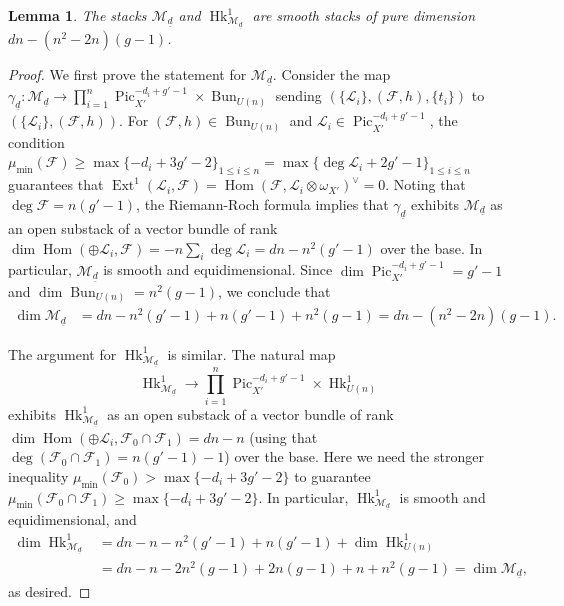 \documentclass[reqno]{amsart}
\numberwithin{equation}{section}
\newcommand{\inj}{\hookrightarrow}
\DeclareMathOperator{\Hom}{Hom}
\DeclareMathOperator{\Aut}{Aut}
\DeclareMathOperator{\Bun}{Bun}
\DeclareMathOperator{\Ext}{Ext}
\DeclareMathOperator{\Pic}{Pic}
\DeclareMathOperator{\Hk}{Hk}
\newcommand\un{\underline}
\newcommand\op{\oplus}
\newcommand\ot{\otimes}
\newcommand\g\gamma
\newcommand{\om}{\omega}
\newcommand\cF{\mathcal{F}}
\newcommand\cL{\mathcal{L}}
\newcommand\cM{\mathcal{M}}
\newtheorem{lemma}[thm]{Lemma}
\theoremstyle{remark}
\numberwithin{equation}{section}
\begin{document}
\begin{lemma}\label{l:low deg M sm} The stacks $\cM_{\un d}$ and $\Hk^{1}_{\cM_{\un d}}$ are smooth stacks of pure dimension $dn - (n^2-2n)(g-1)$.
\end{lemma}
\begin{proof}
We first prove the statement for $\cM_{\un d}$. 
Consider the map $\g_{\un d}: \cM_{\un d}\to \prod_{i=1}^{n}\Pic^{-d_{i}+g'-1}_{X'}\times \Bun_{U(n)}$ sending $(\{\cL_{i}\},(\cF,h),\{t_i\})$ to $(\{\cL_{i}\},(\cF,h))$.  For $(\cF,h)\in \Bun_{U(n)}$ and $\cL_{i}\in \Pic^{-d_{i}+g'-1}_{X'}$, the condition $\mu_{\min}(\cF)\ge\max\{-d_{i}+3g'-2\}_{1\le i\le n}=\max\{\deg\cL_{i}+2g'-1\}_{1\le i\le n}$ guarantees that $\Ext^{1}(\cL_{i}, \cF)=\Hom(\cF,\cL_{i}\ot\om_{X'})^{\vee}=0$. Noting that $\deg \cF = n(g'-1)$, the Riemann-Roch formula implies that $\g_{\un d}$ exhibits $\cM_{\un d}$ as an open substack of a vector bundle of rank $\dim\Hom(\op\cL_{i}, \cF)=-n\sum_{i}\deg\cL_{i}=dn-n^{2}(g'-1)$ over the base. In particular, $\cM_{\un d}$ is smooth and equidimensional. Since $\dim \Pic^{-d_{i}+g'-1}_{X'}=g'-1$ and $\dim \Bun_{U(n)}=n^{2}(g-1)$, we conclude that 
\begin{align*}
\dim\cM_{\un d} & =dn-n^{2}(g'-1) + n (g'-1) + n^{2}(g-1) = dn- (n^2-2n)(g-1).
\end{align*}

The argument for $\Hk^{1}_{\cM_{\un d}}$ is similar. The natural map 
$$
\Hk^{1}_{\cM_{\un d}}\to \prod_{i=1}^{n}\Pic^{-d_{i}+g'-1}_{X'}\times\Hk^{1}_{U(n)}
$$
exhibits $\Hk^{1}_{\cM_{\un d}}$ as an open substack of a vector bundle of rank $\dim\Hom(\op\cL_{i}, \cF_{0}\cap \cF_{1})=dn-n$ (using that $\deg(\cF_{0}\cap\cF_{1})=n(g'-1)-1$) over the base. Here we need the stronger inequality $\mu_{\min}(\cF_{0})>\max\{-d_{i}+3g'-2\}$ to guarantee $\mu_{\min}(\cF_{0}\cap\cF_{1})\ge\max\{-d_{i}+3g'-2\}$. In particular, $\Hk^{1}_{\cM_{\un d}}$ is smooth and equidimensional, and 
\begin{align*}
\dim \Hk^{1}_{\cM_{\un d}} & =dn-n -n^{2}(g'-1)+ n(g'-1)+\dim \Hk^{1}_{U(n)}  \\
&= dn-n -2n^{2}(g-1)+ 2n(g-1) + n + n^2(g-1) =\dim\cM_{\un d},
\end{align*}
as desired. 
\end{proof}
\end{document}
